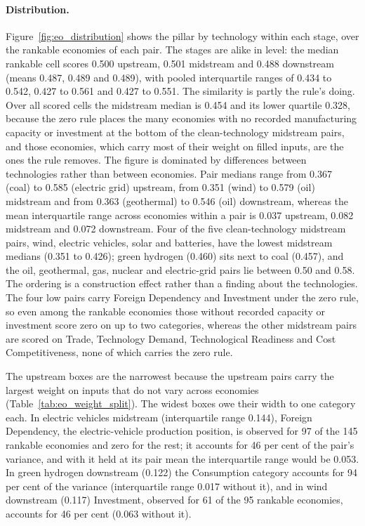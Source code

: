 \paragraph{Distribution.} Figure~\ref{fig:eo_distribution} shows the pillar by technology within
each stage, over the rankable economies of each pair. The stages are alike in level: the median
rankable cell scores 0.500 upstream, 0.501 midstream and 0.488 downstream (means 0.487, 0.489 and
0.489), with pooled interquartile ranges of 0.434 to 0.542, 0.427 to 0.561 and 0.427 to 0.551.
The similarity is partly the rule's doing. Over all scored cells the midstream median is 0.454 and
its lower quartile 0.328, because the zero rule places the many economies with no recorded
manufacturing capacity or investment at the bottom of the clean-technology midstream pairs, and
those economies, which carry most of their weight on filled inputs, are the ones the rule removes.
The figure is dominated by differences between technologies rather than between economies. Pair
medians range from 0.367 (coal) to 0.585 (electric grid) upstream, from 0.351 (wind) to 0.579
(oil) midstream and from 0.363 (geothermal) to 0.546 (oil) downstream, whereas the mean
interquartile range across economies within a pair is 0.037 upstream, 0.082 midstream and 0.072
downstream. Four of the five clean-technology midstream pairs, wind, electric vehicles, solar and
batteries, have the lowest midstream medians (0.351 to 0.426); green hydrogen (0.460) sits next to
coal (0.457), and the oil, geothermal, gas, nuclear and electric-grid pairs lie between 0.50 and
0.58. The ordering is a construction effect rather than a finding about the technologies. The four
low pairs carry Foreign Dependency and Investment under the zero rule, so even among the rankable
economies those without recorded capacity or investment score zero on up to two categories,
whereas the other midstream pairs are scored on Trade, Technology Demand, Technological Readiness
and Cost Competitiveness, none of which carries the zero rule.

The upstream boxes are the narrowest because the upstream pairs carry the largest weight on inputs
that do not vary across economies (Table~\ref{tab:eo_weight_split}). The widest boxes owe their
width to one category each. In electric vehicles midstream (interquartile range 0.144), Foreign
Dependency, the electric-vehicle production position, is observed for 97 of the 145 rankable
economies and zero for the rest; it accounts for 46 per cent of the pair's variance, and with it
held at its pair mean the interquartile range would be 0.053. In green hydrogen downstream (0.122)
the Consumption category accounts for 94 per cent of the variance (interquartile range 0.017
without it), and in wind downstream (0.117) Investment, observed for 61 of the 95 rankable
economies, accounts for 46 per cent (0.063 without it).

